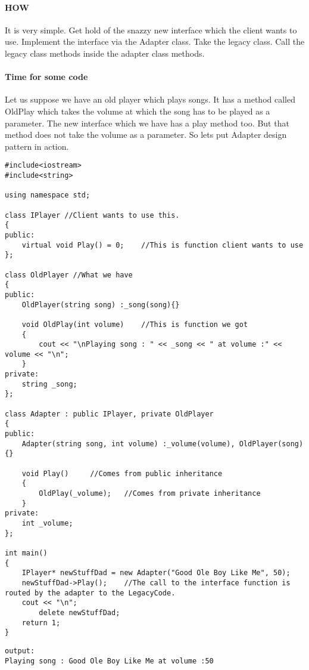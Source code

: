 \documentclass{book}
\begin{document}
\paragraph{HOW}
It is very simple. Get hold of the snazzy new interface which the client wants to use. Implement the interface via the Adapter class.
Take the legacy class. Call the legacy class methods inside the adapter class methods.

\paragraph{Time for some code}
Let us suppose we have an old player which plays songs.
It has a method called OldPlay which takes the volume at which the song has to be played as a parameter.
The new interface which we have has a play method too. But that method does not take the volume as a parameter. So lets put Adapter design pattern in action.
\begin{lstlisting}
#include<iostream>
#include<string>

using namespace std;

class IPlayer //Client wants to use this.
{
public:
	virtual void Play() = 0;	//This is function client wants to use
};

class OldPlayer	//What we have
{
public:
	OldPlayer(string song) :_song(song){}

	void OldPlay(int volume)	//This is function we got 
	{
		cout << "\nPlaying song : " << _song << " at volume :" << volume << "\n";
	}
private:
	string _song;
};

class Adapter : public IPlayer, private OldPlayer
{
public:
	Adapter(string song, int volume) :_volume(volume), OldPlayer(song){}

	void Play()		//Comes from public inheritance
	{
		OldPlay(_volume);	//Comes from private inheritance
	}
private:
	int _volume;
};

int main()
{
	IPlayer* newStuffDad = new Adapter("Good Ole Boy Like Me", 50);
	newStuffDad->Play();	//The call to the interface function is routed by the adapter to the LegacyCode.
	cout << "\n";
        delete newStuffDad;
	return 1;
}
\end{lstlisting}

\begin{verbatim}
output:
Playing song : Good Ole Boy Like Me at volume :50
\end{verbatim}

\end{document}
